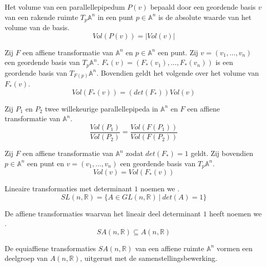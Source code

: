 \documentclass[main.tex]{subfiles}
\begin{document}
\begin{de}
  Het volume van een parallellepipedum $P(v)$ bepaald door een geordende basis $v$ van een rakende ruimte $T_{p}\mathbb{A}^{n}$ in een punt $p\in\mathbb{A}^{n}$ is de absolute waarde van het volume van de basis.
  \[ Vol\left(P(v)\right) = |Vol(v)|\]
\end{de}

\begin{st}
  Zij $F$ een affiene transformatie van $\mathbb{A}^{n}$ en $p\in\mathbb{A}^{n}$ een punt.
  Zij $v= (v_{1},\dotsc,v_{n})$ een geordende basis van $T_{p}\mathbb{A}^{n}$.
  $F_{*}(v) = (F_{*}(v_{1}),\dotsc,F_{*}(v_{n}))$ is een geordende basis van $T_{F(p)}\mathbb{A}^{n}$.
  Bovendien geldt het volgende over het volume van $F_{*}(v)$.
  \[ Vol\left( F_{*}(v) \right) = \left(det(F_{*}) \right)Vol(v) \]
\end{st}

\begin{gev}
  Zij $P_{1}$ en $P_{2}$ twee willekeurige parallellepipeda in $\mathbb{A}^{n}$ en $F$ een affiene transformatie van $\mathbb{A}^{n}$.
  \[ \frac{Vol(P_{1})}{Vol(P_{2})} = \frac{Vol(F(P_{1}))}{Vol(F(P_{2}))} \]
\end{gev}

\begin{gev}
  Zij $F$ een affiene transformatie van $\mathbb{A}^{n}$ zodat $det(F_{*}) = 1$ geldt.
  Zij bovendien $p\in\mathbb{A}^{n}$ een punt en $v= (v_{1},\dotsc,v_{n})$ een geordende basis van $T_{p}\mathbb{A}^{n}$.
  \[ Vol(v) = Vol(F_{*}(v)) \]
\end{gev}

\begin{de}
  Lineaire transformaties met determinant $1$ noemen we .
  \[ SL(n,\mathbb{R}) = \{ A \in GL(n,\mathbb{R}) \ |\ det(A) = 1 \} \]
\end{de}

\begin{de}
  De affiene transformaties waarvan het lineair deel determinant $1$ heeft noemen we .
  \[ SA(n,\mathbb{R}) \subseteq A(n,\mathbb{R}) \]
\end{de}

\begin{st}
  De equiaffiene transformaties $SA(n,\mathbb{R})$ van een affiene ruimte $\mathbb{A}^{n}$ vormen een deelgroep van $A(n,\mathbb{R})$, uitgerust met de samenstellingsbewerking.
\end{st}
\end{document}
